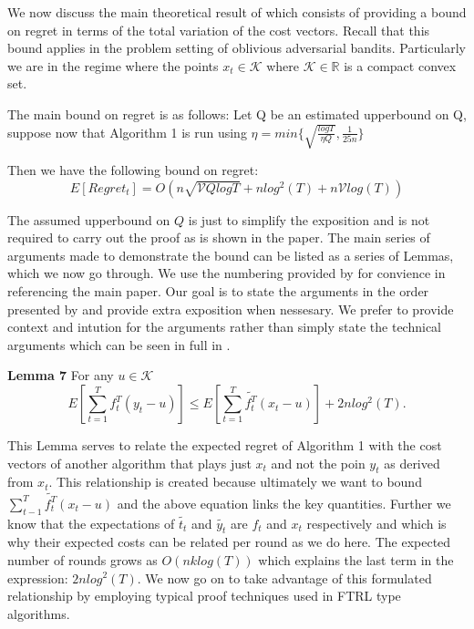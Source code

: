 We now discuss the main theoretical result of \citep{hazan} which consists of providing a bound on regret in terms of the total variation of the cost vectors. Recall that this bound applies
in the problem setting of oblivious adversarial bandits. Particularly we are in the regime where the points $x_t \in \mathcal{K}$ where $\mathcal{K} \in \mathbb{R}$ is a compact 
convex set.

The main bound on regret is as follows: Let Q be an estimated upperbound on Q, suppose now that Algorithm 1 is run using $\eta = min\{\sqrt{\frac{log T}{\eta Q}}, \frac{1}{25n}\}$

Then we have the following bound on regret:
\begin{equation}
  E[Regret_t] = O(n \sqrt{\mathcal{V}Q log T} + n log^2(T) + n \mathcal{V}log(T))
\end{equation}

The assumed upperbound on $Q$ is just to simplify the exposition and is not required to carry out the proof as is shown in the paper. The main series of arguments made to demonstrate the bound can be listed as a series of Lemmas, which we now go through. We use the numbering provided by \citep{hazan} for convience in referencing the main paper. Our goal is to state the arguments in the 
order presented by \citep{hazan} and provide extra exposition when nessesary. We prefer to provide context and intution for the arguments rather than simply state the technical arguments which
can be seen in full in \citep{hazan}.

\textbf{Lemma 7}
For any $u \in \mathcal{K}$
\begin{equation}
  E[\sum_{t=1}^T f_{t}^T(y_t - u)] \leq E[\sum_{t=1}^T \tilde{f_{t}^T}(x_t - u)] + 2nlog^2(T).
\end{equation}

This Lemma serves to relate the expected regret of Algorithm 1 with the cost vectors of another algorithm that plays just $x_t$ and not the poin $y_t$ as derived from $x_t$. This relationship is created because ultimately we want to bound $\sum_{t-1}^T \tilde{f_t^T}(x_t - u)$ and the above equation links the key quantities. Further we know that the expectations of $\tilde{t_t}$ and $\tilde{y_t}$ are $f_t$ and $x_t$ respectively and which is why their expected costs can be related per round as we do here. The expected number of rounds grows as $O(nklog(T))$ which explains the last term in the expression: $2nlog^2(T)$. We now go on to take advantage of this formulated relationship by employing typical proof techniques used in FTRL type algorithms.

